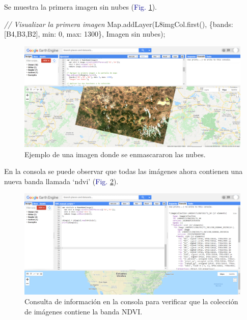 \documentclass[
  12pt,
  letterpaper,
  twoside]{book}
\newenvironment{Shaded}{\begin{snugshade}}{\end{snugshade}}
\newcommand{\BuiltInTok}[1]{#1}
\newcommand{\CommentTok}[1]{\textcolor[rgb]{0.24,0.58,0.00}{\textit{#1}}}
\newcommand{\DataTypeTok}[1]{\textcolor[rgb]{0.00,0.00,0.00}{#1}}
\newcommand{\DecValTok}[1]{\textcolor[rgb]{0.28,0.53,0.93}{#1}}
\newcommand{\FunctionTok}[1]{\textcolor[rgb]{0.48,0.12,0.64}{#1}}
\newcommand{\NormalTok}[1]{#1}
\newcommand{\OperatorTok}[1]{\textcolor[rgb]{0.00,0.00,0.00}{#1}}
\newcommand{\StringTok}[1]{\textcolor[rgb]{0.87,0.29,0.22}{#1}}
\begin{document}
Se muestra la primera imagen sin nubes (\textcolor{darkblue}{Fig.} \ref{fig:f1018}).

\begin{Shaded}
\begin{Highlighting}[]
\CommentTok{// Visualizar la primera imagen}
\BuiltInTok{Map}\OperatorTok{.}\FunctionTok{addLayer}\NormalTok{(L8imgCol}\OperatorTok{.}\FunctionTok{first}\NormalTok{()}\OperatorTok{,} 
\NormalTok{  \{}\DataTypeTok{bands}\OperatorTok{:}\NormalTok{[}\StringTok{\textquotesingle{}B4\textquotesingle{}}\OperatorTok{,}\StringTok{\textquotesingle{}B3\textquotesingle{}}\OperatorTok{,}\StringTok{\textquotesingle{}B2\textquotesingle{}}\NormalTok{]}\OperatorTok{,} \DataTypeTok{min}\OperatorTok{:} \DecValTok{0}\OperatorTok{,} \DataTypeTok{max}\OperatorTok{:} \DecValTok{1300}\NormalTok{\}}\OperatorTok{,}
  \StringTok{\textquotesingle{}Imagen sin nubes\textquotesingle{}}\NormalTok{)}\OperatorTok{;}
\end{Highlighting}
\end{Shaded}

\begin{figure}[H]

{\centering \includegraphics[width=0.95\linewidth]{Img/imSinNubes} 

}

\caption{Ejemplo de una imagen donde se enmascararon las nubes.}\label{fig:f1018}
\end{figure}

En la consola se puede observar que todas las imágenes ahora contienen una nueva banda llamada `ndvi' (\textcolor{darkblue}{Fig.} \ref{fig:f1019}).

\begin{figure}[H]

{\centering \includegraphics[width=0.95\linewidth]{Img/imConNDVI} 

}

\caption{Consulta de información en la consola para verificar que la colección de imágenes contiene la banda NDVI.}\label{fig:f1019}
\end{figure}
\end{document}
